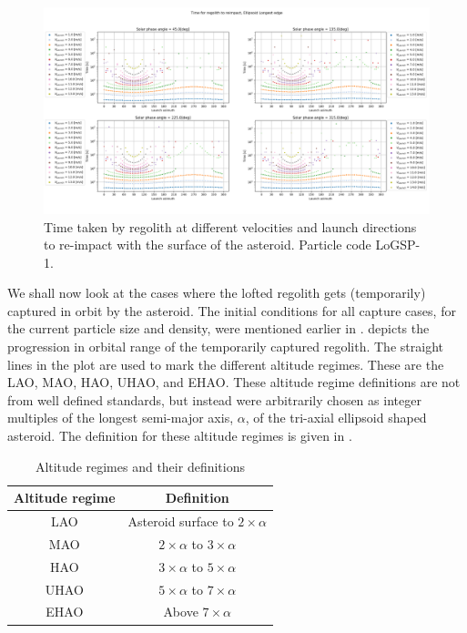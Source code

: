 \begin{figure}[htb]
\centering
\captionsetup{justification=centering}
\includegraphics[angle=90, width=\textwidth, height=\textheight]{longest_edge_perturbations/3.2Density_1cmSize/time_to_reimpact_all_solar_phases.png}
\caption{Time taken by regolith at different velocities and launch directions to re-impact with the surface of the asteroid. Particle code LoGSP-1.}
\label{fig:LoGSP_1_reimpact_time}
\end{figure}
\FloatBarrier
We shall now look at the cases where the lofted regolith gets (temporarily) captured in orbit by the asteroid. The initial conditions for all capture cases, for the current particle size and density, were mentioned earlier in .  depicts the progression in orbital range of the temporarily captured regolith. The straight lines in the plot are used to mark the different altitude regimes. These are the \gls{LAO}, \gls{MAO}, \gls{HAO}, \gls{UHAO}, and \gls{EHAO}. These altitude regime definitions are not from well defined standards, but instead were arbitrarily chosen as integer multiples of the longest semi-major axis, $\alpha$, of the tri-axial ellipsoid shaped asteroid. The definition for these altitude regimes is given in .
\begin{table}[htb]
\centering
\captionsetup{justification=centering}
\caption{Altitude regimes and their definitions}
\label{tab:altitude_regimes}
\begin{tabular}{|c|c|}
\hline
\textbf{Altitude regime}        & \textbf{Definition}                    \\ \hline
\gls{LAO}                       & Asteroid surface to $2 \times \alpha$  \\ \hline
\gls{MAO}                       & $2 \times \alpha$ to $3 \times \alpha$ \\ \hline
\gls{HAO}                       & $3 \times \alpha$ to $5 \times \alpha$ \\ \hline
\gls{UHAO}                      & $5 \times \alpha$ to $7 \times \alpha$ \\ \hline
\gls{EHAO}                      & Above $7 \times \alpha$                \\ \hline
\end{tabular}
\end{table}
